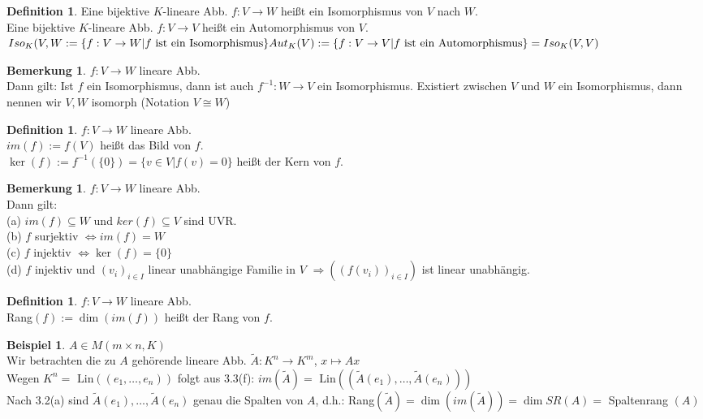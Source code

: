 \documentclass[10pt,a4paper,numbers=endperiod]{scrartcl}
\theoremstyle{definition}
\newtheorem{defi}[satz]{Definition}
\newtheorem{bem}[satz]{Bemerkung}
\newtheorem{bsp}[satz]{Beispiel}
\begin{document}
\begin{defi}
	Eine bijektive $K$-lineare Abb. $f:V\rightarrow W$ heißt ein Isomorphismus von $V$ nach $W$.\\ Eine bijektive $K$-lineare Abb. $f:V\rightarrow V$ heißt ein Automorphismus von $V$.\\
	$Iso_K(V,W:=\{f:V\rightarrow W| f \text{ ist ein Isomorphismus}\}\\
	Aut_K(V):=\{f:V\rightarrow V| f \text{ ist ein Automorphismus}\} = Iso_K(V,V)$
\end{defi}

\begin{bem}
	$f:V\rightarrow W$ lineare Abb.\\
	Dann gilt: Ist $f$ ein Isomorphismus, dann ist auch $f^{-1}: W \rightarrow V$ ein Isomorphismus. Existiert zwischen $V$ und $W$ ein Isomorphismus, dann nennen wir $V,W$ isomorph (Notation $V \cong W$)
\end{bem}

\begin{defi}
	$f:V \rightarrow W$ lineare Abb.\\
	$im(f):= f(V)$ heißt das Bild von $f$.\\
	$\ker(f) := f^{-1}(\{0\})=\{v\in V| f(v)=0\}$ heißt der Kern von $f$.
\end{defi}

\begin{bem}
	$f:V\rightarrow W$ lineare Abb.\\
	Dann gilt:\\
	(a) $im(f) \subseteq W$ und $ker(f) \subseteq V$ sind UVR.\\
	(b) $f$ surjektiv $\Leftrightarrow im(f) = W$\\
	(c) $f$ injektiv $\Leftrightarrow \ker(f) = \{0\}$\\
	(d) $f$ injektiv und $(v_i)_{i \in I}$ linear unabhängige Familie in $V$ $\Rightarrow ((f(v_i))_{i\in I})$ ist linear unabhängig.
\end{bem}

\begin{defi}
	$f: V \rightarrow W$ lineare Abb.\\
	Rang$(f):= \dim(im(f))$ heißt der Rang von $f$.
\end{defi}

\begin{bsp}
	$A \in M(m\times n,K)$\\
	Wir betrachten die zu $A$ gehörende lineare Abb. $\tilde{A}: K^n \rightarrow K^m$, $x\mapsto Ax$\\
	Wegen $K^n = \text{ Lin}((e_1, \ldots, e_n))$ folgt aus 3.3(f): $im(\tilde{A}) = \text{ Lin}((\tilde{A}(e_1),\ldots,\tilde{A}(e_n)))$\\
	Nach 3.2(a) sind $\tilde{A}(e_1),\ldots,\tilde{A}(e_n)$ genau die Spalten von $A$, d.h.: Rang$(\tilde{A}) = \dim (im(\tilde{A})) = \dim SR(A) =$ Spaltenrang $(A)$
\end{bsp}
\end{document}
